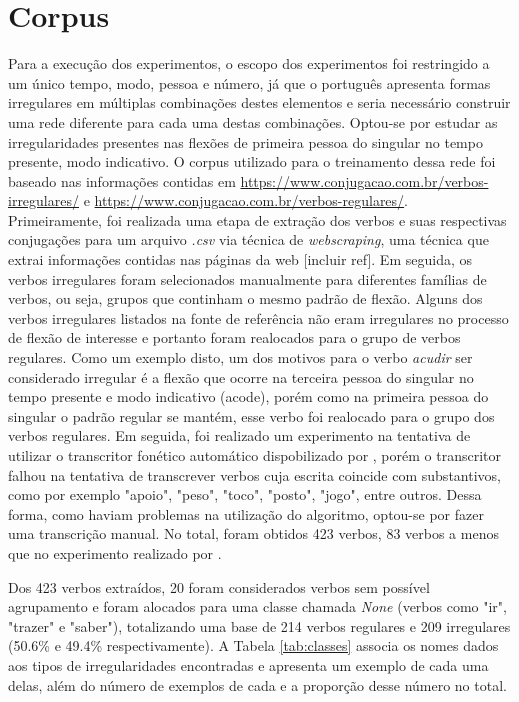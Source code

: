 \chapter{Corpus}
\label{ch:06}

Para a execução dos experimentos, o escopo dos experimentos foi restringido a um único tempo, modo, pessoa e número, já que o português apresenta formas irregulares em múltiplas combinações destes elementos e seria necessário construir uma rede diferente para cada uma destas combinações. Optou-se por estudar as irregularidades presentes nas flexões de primeira pessoa do singular no tempo presente, modo indicativo.  
O corpus utilizado para o treinamento dessa rede foi baseado nas informações contidas em \url{https://www.conjugacao.com.br/verbos-irregulares/} e \url{https://www.conjugacao.com.br/verbos-regulares/}.\\
Primeiramente, foi realizada uma etapa de extração dos verbos e suas respectivas conjugações para um arquivo \textit{.csv} via técnica de \textit{webscraping}, uma técnica que extrai informações contidas nas páginas da web [incluir ref]. Em seguida, os verbos irregulares foram selecionados manualmente para diferentes famílias de verbos, ou seja, grupos que continham o mesmo padrão de flexão. Alguns dos verbos irregulares listados na fonte de referência não eram irregulares no processo de flexão de interesse e portanto foram realocados para o grupo de verbos regulares. Como um exemplo disto, um dos motivos para o verbo \textit{acudir} ser considerado irregular é a flexão que ocorre na terceira pessoa do singular no tempo presente e modo indicativo (acode), porém como na primeira pessoa do singular o padrão regular se mantém, esse verbo foi realocado para o grupo dos verbos regulares. Em seguida, foi realizado um experimento na tentativa de utilizar o transcritor fonético automático dispobilizado por \cite{guide:2016}, porém o transcritor falhou na tentativa de transcrever verbos cuja escrita coincide com substantivos, como por exemplo "apoio", "peso", "toco", "posto", "jogo", entre outros. Dessa forma, como haviam problemas na utilização do algoritmo, optou-se por fazer uma transcrição manual. No total, foram obtidos 423 verbos, 83 verbos a menos que no experimento realizado por \cite{rumelhart:1986}.

Dos 423 verbos extraídos, 20 foram considerados verbos sem possível agrupamento e foram alocados para uma classe chamada \textit{None} (verbos como "ir", "trazer" e "saber"), totalizando uma base de 214 verbos regulares e 209 irregulares (50.6\% e 49.4\% respectivamente). A Tabela \ref{tab:classes} associa os nomes dados aos tipos de irregularidades encontradas e apresenta um exemplo de cada uma delas, além do número de exemplos de cada e a proporção desse número no total. 


